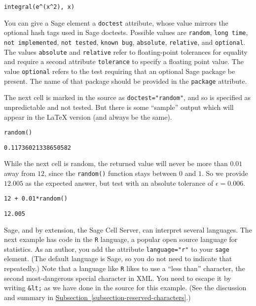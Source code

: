 \documentclass[10pt,]{article}
\theoremstyle{plain}
\theoremstyle{definition}
\theoremstyle{definition}
\theoremstyle{definition}
\theoremstyle{definition}
\theoremstyle{definition}
\theoremstyle{definition}
\numberwithin{equation}{section}
\begin{document}
\begin{lstlisting}[style=sageinput]
integral(e^(x^2), x)
\end{lstlisting}
\hypertarget{p-16}{}%
You can give a Sage element a \lstinline?doctest? attribute, whose value mirrors the optional hash tags used in Sage doctests.  Possible values are \lstinline?random?, \lstinline?long time?, \lstinline?not implemented?, \lstinline?not tested?, \lstinline?known bug?, \lstinline?absolute?, \lstinline?relative?, and \lstinline?optional?.  The values \lstinline?absolute? and \lstinline?relative? refer to floating-point tolerances for equality and require a second attribute \lstinline?tolerance? to specify a floating point value.  The value \lstinline?optional? refers to the test requiring that an optional Sage package be present.  The name of that package should be provided in the \lstinline?package? attribute.%
\par
\hypertarget{p-17}{}%
The next cell is marked in the source as \lstinline?doctest="random"?, and so is specified as unpredictable and not tested.  But there is some ``sample'' output which will appear in the \LaTeX{} version (and always be the same).%
\begin{lstlisting}[style=sageinput]
random()
\end{lstlisting}
\begin{lstlisting}[style=sageoutput]
0.11736021338650582
\end{lstlisting}
\hypertarget{p-18}{}%
While the next cell is random, the returned value will never be more than \(0.01\) away from \(12\), since the \lstinline?random()? function stays between \(0\) and \(1\).  So we provide \(12.005\) as the expected answer, but test with an absolute tolerance of \(\epsilon=0.006\).%
\begin{lstlisting}[style=sageinput]
12 + 0.01*random()
\end{lstlisting}
\begin{lstlisting}[style=sageoutput]
12.005
\end{lstlisting}
\hypertarget{p-19}{}%
Sage, and by extension, the Sage Cell Server, can interpret several languages.  The next example has code in the \lstinline?R? language, a popular open source language for statistics.  As an author, you add the attribute \lstinline?language="r"? to your \lstinline?sage? element.  (The default language is Sage, so you do not need to indicate that repeatedly.)  Note that a language like \lstinline?R? likes to use a ``less than'' character, the second most-dangerous special character in XML.  You need to escape it by writing \lstinline?&lt;? as we have done in the source for this example.  (See the discussion and summary in \hyperref[subsection-reserved-characters]{Subsection~\ref{subsection-reserved-characters}}.)%
\end{document}
